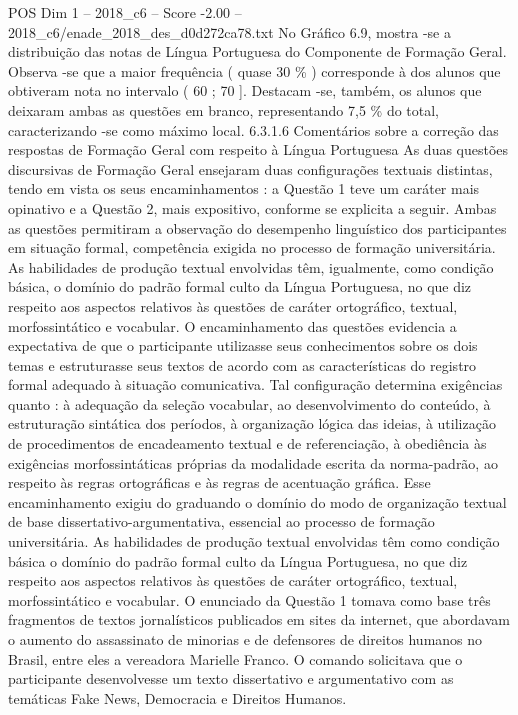 \begin{textsample}{POS Dim 1 – 2018\_c6 – Score -2.00 – 2018\_c6/enade\_2018\_des\_d0d272ca78.txt}
No Gráfico 6.9, mostra -se a distribuição das notas de Língua Portuguesa do Componente de Formação Geral.
Observa -se que a maior frequência ( quase 30 \% ) corresponde à dos alunos que obtiveram nota no intervalo ( 60 ; 70 ].
Destacam -se, também, os alunos que deixaram ambas as questões em branco, representando 7,5 \% do total, caracterizando -se como máximo local. 6.3.1.6 Comentários sobre a correção das respostas de Formação Geral com respeito à Língua Portuguesa As duas questões discursivas de Formação Geral ensejaram duas configurações textuais distintas, tendo em vista os seus encaminhamentos : a Questão 1 teve um caráter mais opinativo e a Questão 2, mais expositivo, conforme se explicita a seguir.
Ambas as questões permitiram a observação do desempenho linguístico dos participantes em situação formal, competência exigida no processo de formação universitária.
As habilidades de produção textual envolvidas têm, igualmente, como condição básica, o domínio do padrão formal culto da Língua Portuguesa, no que diz respeito aos aspectos relativos às questões de caráter ortográfico, textual, morfossintático e vocabular.
O encaminhamento das questões evidencia a expectativa de que o participante utilizasse seus conhecimentos sobre os dois temas e estruturasse seus textos de acordo com as características do registro formal adequado à situação comunicativa.
Tal configuração determina exigências quanto : à adequação da seleção vocabular, ao desenvolvimento do conteúdo, à estruturação sintática dos períodos, à organização lógica das ideias, à utilização de procedimentos de encadeamento textual e de referenciação, à obediência às exigências morfossintáticas próprias da modalidade escrita da norma-padrão, ao respeito às regras ortográficas e às regras de acentuação gráfica.
Esse encaminhamento exigiu do graduando o domínio do modo de organização textual de base dissertativo-argumentativa, essencial ao processo de formação universitária.
As habilidades de produção textual envolvidas têm como condição básica o domínio do padrão formal culto da Língua Portuguesa, no que diz respeito aos aspectos relativos às questões de caráter ortográfico, textual, morfossintático e vocabular.
O enunciado da Questão 1 tomava como base três fragmentos de textos jornalísticos publicados em sites da internet, que abordavam o aumento do assassinato de minorias e de defensores de direitos humanos no Brasil, entre eles a vereadora Marielle Franco.
O comando solicitava que o participante desenvolvesse um texto dissertativo e argumentativo com as temáticas Fake News, Democracia e Direitos Humanos.

\end{textsample}
